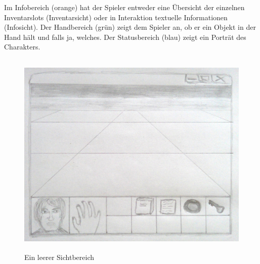 Im \gls{Infobereich} (orange) hat der Spieler entweder eine Übersicht der einzelnen Inventarslots 
(Inventarsicht) oder in Interaktion textuelle Informationen (Infosicht). Der \gls{Handbereich} (grün) zeigt 
dem Spieler an, ob er ein Objekt in 
der Hand hält und falls ja, welches. Der \gls{Statusbereich} (blau) zeigt ein Porträt des Charakters.
\\
\begin{figure}[h]
	\begin{center}
		\includegraphics[width=13cm, height=10cm]{kapitel/ui/ig_leer_small.jpg}
	\end{center}
	\caption{Ein leerer Sichtbereich}
	\label{fig:ig_leer}
\end{figure}


